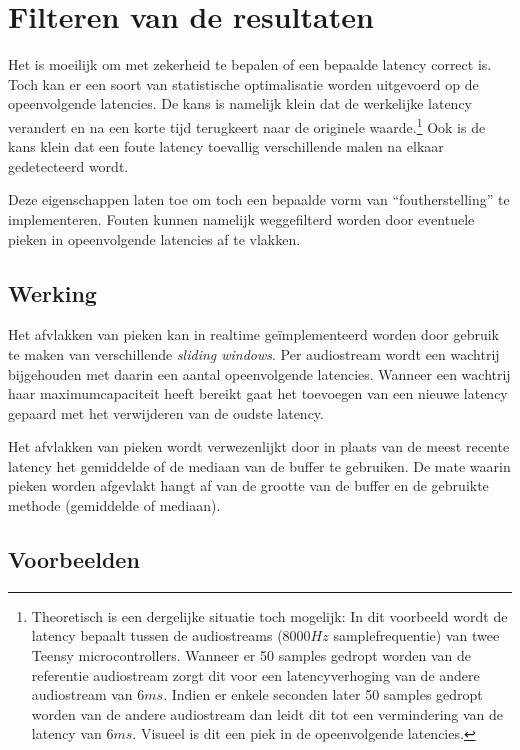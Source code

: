 \section{Filteren van de resultaten}
\label{filtering}

Het is moeilijk om met zekerheid te bepalen of een bepaalde latency correct is. Toch kan er een soort van statistische optimalisatie worden uitgevoerd op de opeenvolgende latencies. De kans is namelijk klein dat de werkelijke latency verandert en na een korte tijd terugkeert naar de originele waarde.\footnote{Theoretisch is een dergelijke situatie toch mogelijk: In dit voorbeeld wordt de latency bepaalt tussen de audiostreams ($ 8000 Hz$ samplefrequentie) van twee Teensy microcontrollers. Wanneer er 50 samples gedropt worden van de referentie audiostream zorgt dit voor een latencyverhoging van de andere audiostream van $6 ms$. Indien er enkele seconden later 50 samples gedropt worden van de andere audiostream dan leidt dit tot een vermindering van de latency van $ 6 ms $. Visueel is dit een piek in de opeenvolgende latencies.} Ook is de kans klein dat een foute latency toevallig verschillende malen na elkaar gedetecteerd wordt.

Deze eigenschappen laten toe om toch een bepaalde vorm van ``foutherstelling'' te implementeren. Fouten kunnen namelijk weggefilterd worden door eventuele pieken in opeenvolgende latencies af te vlakken.

\subsection{Werking}

Het afvlakken van pieken kan in realtime geïmplementeerd worden door gebruik te maken van verschillende \textit{sliding windows}. Per audiostream wordt een wachtrij bijgehouden met daarin een aantal opeenvolgende latencies. Wanneer een wachtrij haar maximumcapaciteit heeft bereikt gaat het toevoegen van een nieuwe latency gepaard met het verwijderen van de oudste latency.

Het afvlakken van pieken wordt verwezenlijkt door in plaats van de meest recente latency het gemiddelde of de mediaan van de buffer te gebruiken. De mate waarin pieken worden afgevlakt hangt af van de grootte van de buffer en de gebruikte methode (gemiddelde of mediaan).

\subsection{Voorbeelden}

